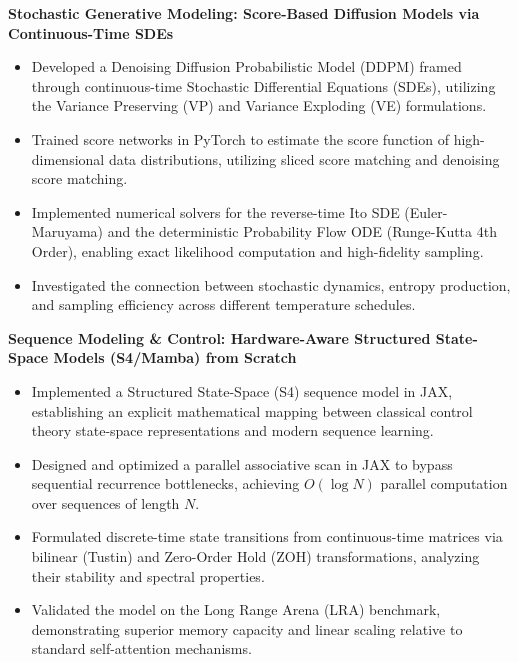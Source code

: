 \documentclass[10pt, letterpaper]{article}
\begin{document}
\textbf{Stochastic Generative Modeling: Score-Based Diffusion Models via Continuous-Time SDEs}
\begin{itemize}
    \item Developed a Denoising Diffusion Probabilistic Model (DDPM) framed through continuous-time Stochastic Differential Equations (SDEs), utilizing the Variance Preserving (VP) and Variance Exploding (VE) formulations.
    \item Trained score networks in PyTorch to estimate the score function of high-dimensional data distributions, utilizing sliced score matching and denoising score matching.
    \item Implemented numerical solvers for the reverse-time Ito SDE (Euler-Maruyama) and the deterministic Probability Flow ODE (Runge-Kutta 4th Order), enabling exact likelihood computation and high-fidelity sampling.
    \item Investigated the connection between stochastic dynamics, entropy production, and sampling efficiency across different temperature schedules.
\end{itemize}

\textbf{Sequence Modeling \& Control: Hardware-Aware Structured State-Space Models (S4/Mamba) from Scratch}
\begin{itemize}
    \item Implemented a Structured State-Space (S4) sequence model in JAX, establishing an explicit mathematical mapping between classical control theory state-space representations and modern sequence learning.
    \item Designed and optimized a parallel associative scan in JAX to bypass sequential recurrence bottlenecks, achieving $O(\log N)$ parallel computation over sequences of length $N$.
    \item Formulated discrete-time state transitions from continuous-time matrices via bilinear (Tustin) and Zero-Order Hold (ZOH) transformations, analyzing their stability and spectral properties.
    \item Validated the model on the Long Range Arena (LRA) benchmark, demonstrating superior memory capacity and linear scaling relative to standard self-attention mechanisms.
\end{itemize}

\end{document}

